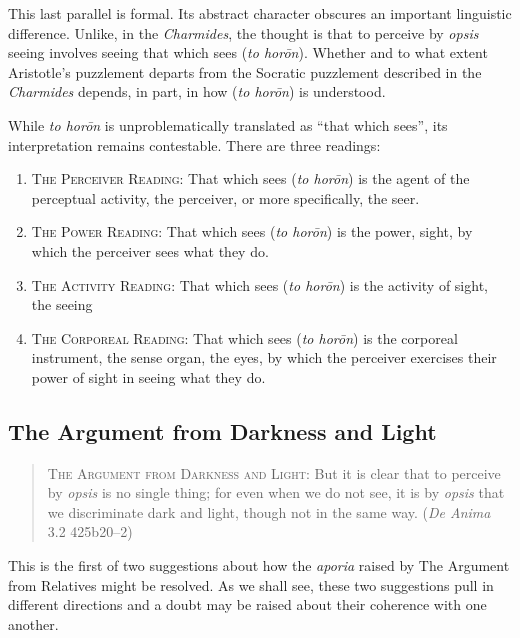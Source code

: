 This last parallel is formal. Its abstract character obscures an important linguistic difference. Unlike, in the \emph{Charmides}, the thought is that to perceive by \emph{opsis} seeing involves seeing that which sees (\emph{to horōn}). Whether and to what extent Aristotle's puzzlement departs from the Socratic puzzlement described in the \emph{Charmides} depends, in part, in how (\emph{to horōn}) is understood.

While \emph{to horōn} is unproblematically translated as ``that which sees'', its interpretation remains contestable. There are three readings:
\begin{enumerate}[(1)]
	\item \textsc{The Perceiver Reading}: That which sees (\emph{to horōn}) is the agent of the perceptual activity, the perceiver, or more specifically, the seer.
	\item \textsc{The Power Reading}: That which sees (\emph{to horōn}) is the power, sight, by which the perceiver sees what they do.
	\item \textsc{The Activity Reading}: That which sees (\emph{to horōn}) is the activity of sight, the seeing
	\item \textsc{The Corporeal Reading}: That which sees (\emph{to horōn}) is the corporeal instrument, the sense organ, the eyes, by which the perceiver exercises their power of sight in seeing what they do.
\end{enumerate}


\subsection{The Argument from Darkness and Light} %
\label{sub:the_argument_from_darkness}

\begin{quote}
	\textsc{The Argument from Darkness and Light}: But it is clear that to perceive by \emph{opsis} is no single thing; for even when we do not see, it is by \emph{opsis} that we discriminate dark and light, though not in the same way. (\emph{De Anima} 3.2 425b20–2)
\end{quote}

This is the first of two suggestions about how the \emph{aporia} raised by The Argument from Relatives might be resolved. As we shall see, these two suggestions pull in different directions and a doubt may be raised about their coherence with one another.

